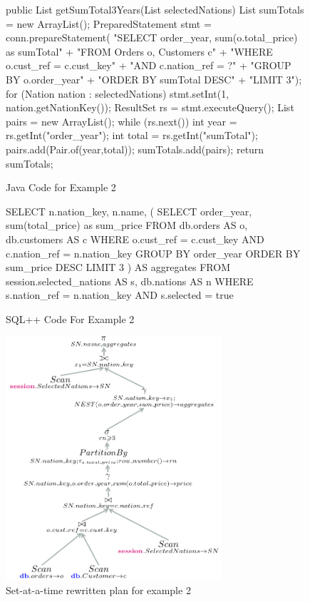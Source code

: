\begin{figure}[p]
\centering
\begin{minipage}{0.45\textwidth}
\centering
\begin{Java}[basicstyle=\small]
public List getSumTotal3Years(List selectedNations)  {
  List sumTotals = new ArrayList();
  PreparedStatement stmt = conn.prepareStatement(
      "SELECT order_year, sum(o.total_price) as sumTotal\n"
   + "FROM Orders o, Customers c\n"
   + "WHERE o.cust_ref = c.cust_key\n"
   + "AND c.nation_ref = ?\n"
   + "GROUP BY o.order_year\n"
   + "ORDER BY sumTotal DESC\n"
   + "LIMIT 3");
   for (Nation nation : selectedNations) {
      stmt.setInt(1, nation.getNationKey());
      ResultSet rs = stmt.executeQuery();
      List pairs = new ArrayList();
      while (rs.next()) {
         int year = rs.getInt("order_year");
         int total = rs.getInt("sumTotal");
         pairs.add(Pair.of(year,total));
      }
      sumTotals.add(pairs);
   }
   return sumTotals;
}
\end{Java}
\caption{Java Code for Example 2}
\label{fig:code-complex}
\end{minipage} \hfill
\begin{minipage}{0.45\textwidth}
\centering
\begin{SQL}
SELECT n.nation_key, n.name, (
  SELECT order_year,
         sum(total_price) as sum_price
  FROM db.orders AS o,
       db.customers AS c
  WHERE o.cust_ref = c.cust_key
  AND c.nation_ref = n.nation_key
  GROUP BY order_year
  ORDER BY sum_price DESC
  LIMIT 3
) AS aggregates
FROM session.selected_nations AS s,
     db.nations AS n
WHERE s.nation_ref = n.nation_key
AND  s.selected = true
\end{SQL}
\caption{SQL++ Code For Example 2}
\label{fig:complex-query}
\end{minipage} \hfill
\centering
\includegraphics[width=8cm]{images/distributed-complex-plan}
\caption{Set-at-a-time rewritten plan for example 2}
\label{fig:complex-example-plan}
\end{figure}

